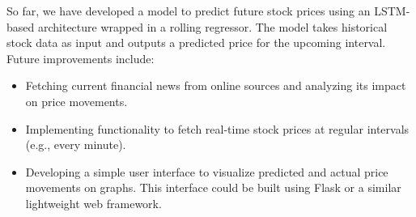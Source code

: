\documentclass{article}
\begin{document}
 {\noindent \fontsize{12}{16}\selectfont
  So far, we have developed a model to predict future stock prices using an
  LSTM-based architecture wrapped in a rolling regressor. The model takes
  historical stock data as input and outputs a predicted price for the upcoming
  interval.
  \\[0.3cm]
  \noindent Future improvements include:
  \begin{itemize}
      \item Fetching current financial news from online sources and analyzing
            its
            impact on price movements.
      \item Implementing functionality to fetch real-time stock prices at
            regular
            intervals (e.g., every minute).
      \item Developing a simple user interface to visualize predicted and
            actual
            price movements on graphs. This interface could be built using
            Flask
            or a
            similar lightweight web framework.
  \end{itemize}}
\end{document}
